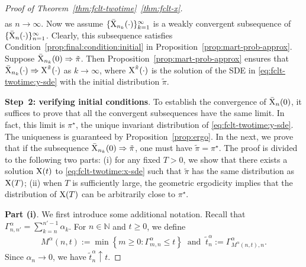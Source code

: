\documentclass[11pt]{article}
\theoremstyle{plain}
\theoremstyle{definition}
\def\ermX{{\textnormal{X}}}
\def\NB{{\mathbb N}}
\newcommand{\xbar}{{\bar{\textnormal{X}}}}
\newcommand{\ssum}[3]{\sum\limits_{{#1}={#2}}^{#3}}
\def\weakconverge{\Rightarrow}
\begin{document}
\begin{appendix}
\begin{proof}[Proof of Theorem~\ref{thm:fclt-twotime}~\ref{thm:fclt-x}]
\begin{align*}
    \end{align*}
    as $n \to \infty$.
    Now we assume $ \{ \xbar_{n_k} (\cdot) \}_{k=1}^\infty $ is a weakly convergent subsequence of $ \{ \xbar_{n} (\cdot) \}_{n=1}^\infty$.
    Clearly, this subsequence satisfies Condition~\ref{prop:final:condition:initial} in Proposition~\ref{prop:mart-prob-approx}.
    Suppose $\xbar_{n_k} (0) \weakconverge \tilde{\pi}$. Then Proposition~\ref{prop:mart-prob-approx} ensures that $\xbar_{n_k}(\cdot) \weakconverge \ermX^{\tilde{\pi}}(\cdot)$ as $k \to \infty$, where $\ermX^{\tilde{\pi}}(\cdot)$ is the solution of the SDE in \eqref{eq:fclt-twotime:y-sde} with the initial distribution $\tilde\pi$.
    \vspace{0.2cm}
    
    \textbf{Step~2: verifying initial conditions}. 
    To establish the convergence of $\xbar_{n}(0)$, it suffices to prove that all the convergent subsequences have the same limit.
    In fact, this limit is $\pi^\star$, the unique invariant distribution of \eqref{eq:fclt-twotime:y-sde}. The uniqueness is guaranteed by Proposition~\ref{prop:ergo}.
    In the next, we prove that if the subsequence $\xbar_{n_k}(0) \weakconverge \tilde{\pi}$, one must have $\tilde{\pi} = \pi^\star$. 
    The proof is divided to the following two parts: (i) for any fixed $T > 0$, we show that there exists a solution $\ermX(t)$ to \eqref{eq:fclt-twotime:x-sde} such that $\tilde{\pi}$ has the same distribution as $\ermX(T)$;
    (ii) when $T$ is sufficiently large, the geometric ergodicity implies that the distribution of $\ermX(T)$ can be arbitrarily close to $\pi^\star$.
    
    \textbf{Part (i)}.
    We first introduce some additional notation.
    Recall that $\Gamma^\alpha_{n,n'} = \ssum{k}{n}{n'-1} \alpha_k$.
    For $n \in \NB$ and $t \ge 0$, we define 
    \begin{align*}
        M^\alpha (n,t) := \min\left\{ m \ge 0 \colon \Gamma^\alpha_{m,n} \le t \right\}\ \text{ and } \
        \tilde{t}^\alpha_{n} := \Gamma^\alpha_{M^\alpha(n,t), n}.
    \end{align*}
    Since $\alpha_{n} \to 0$, we have $\tilde{t}^\alpha_{n} \uparrow t$.
    

\end{proof}
\end{appendix}
\end{document}
